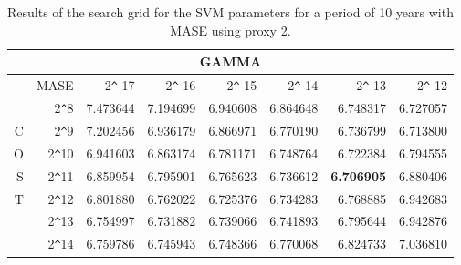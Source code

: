 \begin{table}[h!]
\centering
\begin{adjustbox}{width=\textwidth}
\begin{tabular}{|r|r|rrrrrr|}
\hline
\multicolumn{8}{|c|}{GAMMA} \tabularnewline
\hline
 &MASE& 2\verb|^|-17 & 2\verb|^|-16 & 2\verb|^|-15 & 2\verb|^|-14 & 2\verb|^|-13 & 2\verb|^|-12 \\ 
  \hline
  &2\verb|^|8 & 7.473644 & 7.194699 & 6.940608 & 6.864648 & 6.748317 & 6.727057 \\ 
  C&2\verb|^|9 & 7.202456 & 6.936179 & 6.866971 & 6.770190 & 6.736799 & 6.713800 \\ 
  O&2\verb|^|10 & 6.941603 & 6.863174 & 6.781171 & 6.748764 & 6.722384 & 6.794555 \\ 
  S&2\verb|^|11 & 6.859954 & 6.795901 & 6.765623 & 6.736612 & \textbf{6.706905} & 6.880406 \\ 
  T&2\verb|^|12 & 6.801880 & 6.762022 & 6.725376 & 6.734283 & 6.768885 & 6.942683 \\ 
  &2\verb|^|13 & 6.754997 & 6.731882 & 6.739066 & 6.741893 & 6.795644 & 6.942876 \\ 
  &2\verb|^|14 & 6.759786 & 6.745943 & 6.748366 & 6.770068 & 6.824733 & 7.036810 \\ 
   \hline
\end{tabular}
\end{adjustbox}
\caption{Results of the search grid for the SVM parameters for a period of 10 years with MASE using proxy 2.}
\end{table}